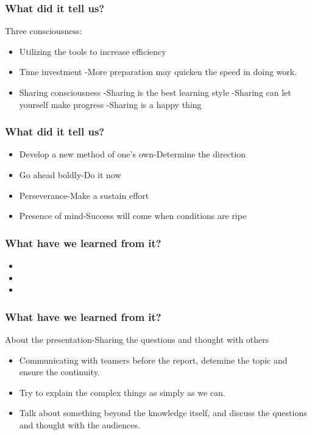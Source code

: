 \documentclass[notheorems,mathserif,table,compress]{beamer}  %
\begin{document}
%
\begin{frame}
\frametitle{What did it tell us?}
Three consciousness:
\begin{itemize}
\item Utilizing the tools to increase efficiency
\item Time investment \newline
-More preparation may quicken the speed in doing work.
\item Sharing consciousness \newline
-Sharing is the best learning style \newline
-Sharing can let yourself make progress \newline
-Sharing is a happy thing
\end{itemize}
\end{frame}

%
\begin{frame}
\frametitle{What did it tell us?}
\begin{itemize}
\item Develop a new method of one's own-Determine the direction
\item Go ahead boldly-Do it now
\item Perseverance-Make a sustain effort 
\item Presence of mind-Success will come when conditions are ripe
\end{itemize}
\end{frame}


%
\begin{frame}
\frametitle{What have we learned from it?}
\begin{itemize}
\item 
\item
\item 
\end{itemize}
\end{frame}

%
\begin{frame}
\frametitle{What have we learned from it?}
About the presentation-Sharing the questions and thought with others
\begin{itemize}
\item Communicating with teamers before the report, detemine the topic and ensure the continuity.
\item Try to explain the complex things as simply as we can.
\item Talk about something beyond the knowledge itself, and discuss the questions and thought with the audiences.
\end{itemize}
\end{frame}
\end{document}

